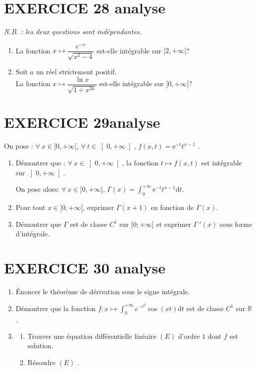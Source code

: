 \documentclass[10pt,oneside]{article}
\begin{document}
\begin{flushleft}
\section*{EXERCICE 28 \:analyse }

\emph{N.B. : les deux questions sont ind\'{e}pendantes.}

\begin{enumerate}
\item La fonction $x\longmapsto \dfrac{e^{-x}}{\sqrt{x^{2}-4}}$ est-elle int\'{e}grable sur $]2,+\infty[$?
\item Soit $a$ un réel strictement positif.\\ La fonction $x\longmapsto \dfrac{\ln x}{\sqrt{1+x^{2a}}}$ est-elle int\'{e}grable sur $]0,+\infty[$?

\end{enumerate}

\section*{EXERCICE 29\:analyse }

On pose :  $\forall\:x\in ]0,+\infty[$,  $\forall\:t\in \left] 0,+\infty\right[ $, 
$f(x,t)=\text{e}^{-t}t^{x-1}$ .

\begin{enumerate}
\item Démontrer que : $\forall \:x\in \left]0,+\infty \right[$,  la fonction $t\mapsto f(x,t)$ est intégrable sur $\left] 0,+\infty\right[ $. \bigskip

On pose alors: $\forall \:x\in]0,+\infty[$, $\Gamma(x)=\displaystyle\int_0^{+\infty}\text{e}^{-t}t^{x-1}\text{d}t$.
\item Pour tout $x\in]0,+\infty[$, exprimer $\Gamma(x+1)$ en fonction de $\Gamma(x)$.
\item Démontrer que $\Gamma$ est de classe $C^1$ sur $]0;+\infty[$  et exprimer $\Gamma~\!'(x)$ sous forme d'intégrale.
\end{enumerate}


\section*{EXERCICE 30 \:analyse }

\begin{enumerate}
\item \'Enoncer le th\'{e}or\`{e}me de d\'{e}rivation sous le signe int\'{e}grale.
\item D\'{e}montrer que la fonction $f:x\longmapsto \displaystyle\int_{0}^{+\infty }e^{-t^{2}}\cos \left( xt\right) \text{d}t$ est de classe $C^{1}$ sur $\mathbb{R}$.
\item 
\begin{enumerate}
\item Trouver une \'{e}quation diff\'{e}rentielle lin\'{e}aire $\left(E\right)$ d'ordre $1$ dont $f$ est solution.
\item
 Résoudre $\left(E\right)$ .
 \end{enumerate}
\end{enumerate}




\end{flushleft}
\end{document}
